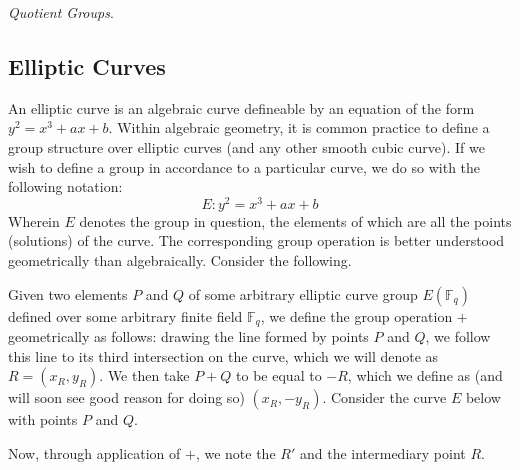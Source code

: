 \noindent
\emph{Quotient Groups}.

\subsection{Elliptic Curves}

An elliptic curve is an algebraic curve defineable by an equation of the form $y^2 = x^3 + ax + b$. Within algebraic geometry, it is common practice to define a group structure over elliptic curves (and any other smooth cubic curve). If we wish to define a group in accordance to a particular curve, we do so with the following notation:
$$
E: y^2 = x^3 + ax + b
$$
Wherein $E$ denotes the group in question, the elements of which are all the points (solutions) of the curve. The corresponding group operation is better understood geometrically than algebraically. Consider the following.

Given two elements $P$ and $Q$ of some arbitrary elliptic curve group $E(\mathbb{F}_q)$ defined over some arbitrary finite field $\mathbb{F}_q$, we define the group operation $+$ geometrically as follows: drawing the line formed by points $P$ and $Q$, we follow this line to its third intersection on the curve, which we will denote as $R = (x_R, y_R)$. We then take $P + Q$ to be equal to $-R$, which we define as (and will soon see good reason for doing so) $(x_R, -y_R)$. Consider the curve $E$ below with points $P$ and $Q$.
\begin{center}
\end{center}

Now, through application of $+$, we note the $R'$ and the intermediary point $R$.

\begin{center}
\end{center}

